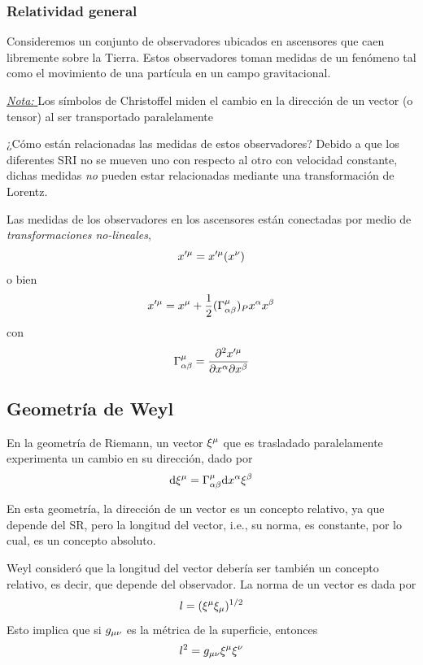 \subsubsection{Relatividad general}
Consideremos un conjunto de observadores ubicados en ascensores que caen libremente sobre la Tierra. Estos observadores toman medidas de un fenómeno tal como el movimiento de una partícula en un campo gravitacional. 




\underline{\textit{Nota: }}Los símbolos de Christoffel miden el cambio en la dirección de un vector (o tensor) al ser transportado paralelamente

¿Cómo están relacionadas las medidas de estos observadores? Debido a que los diferentes SRI no se mueven uno con respecto al otro con velocidad constante, dichas medidas \textit{no} pueden estar relacionadas mediante una transformación de Lorentz. 

Las medidas de los observadores en los ascensores están conectadas por medio de \textit{transformaciones no-lineales},
\begin{equation}
  x'^\mu =x'^\mu (x^\nu )
\end{equation}
o bien
\begin{equation}
  x'^\mu =x^\mu +\frac{1}{2}(\Gamma ^\mu _{\alpha\beta })_Px^\alpha x^\beta 
\end{equation}
con
\begin{equation}
  \Gamma^\mu _{\alpha\beta }=\pdv{x'^\mu}{x^\alpha}{x^\beta}
\end{equation}

\subsection{Geometría de Weyl}
En la geometría de Riemann, un vector $\xi^\mu $ que es trasladado paralelamente experimenta un cambio en su dirección, dado por
\begin{equation}
  \dd \xi^\mu =\Gamma^\mu _{\alpha\beta }\dd x^\alpha \xi^\beta 
\end{equation}

En esta geometría, la dirección de un vector es un concepto relativo, ya que depende del SR, pero la longitud del vector, i.e.,  su norma, es constante, por lo cual, es un concepto absoluto.

Weyl consideró que la longitud del vector debería ser también un concepto relativo, es decir, que depende del observador. La norma de un vector es dada por
\begin{equation}
  l=(\xi^\mu \xi_\mu )^{1/2}
\end{equation}
Esto implica que si $g_{\mu\nu }$ es la métrica de la superficie, entonces
\begin{equation}\label{19.1}
  l^2=g_{\mu\nu }\xi^\mu\xi^\nu 
\end{equation}

